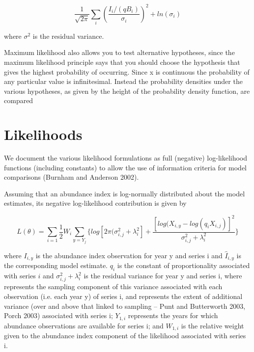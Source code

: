 \documentclass[a4paper,10pt]{article}
\begin{document}
\begin{equation}\label{eq4}
\frac{1}{\sqrt{2\pi}} \sum_i \left( \frac{I_{i}/(qB_{i})}{{\sigma}_{i}} \right)^2 +ln({\sigma}_{i})
\end{equation}

where $\sigma^2$ is the residual variance.

Maximum likelihood also allows you to test alternative hypotheses, since the maximum likelihood principle says that you should choose the hypothesis that gives the highest probability of occurring. Since x is continuous the probability of any particular value is infinitesimal. Instead the probability densities under the various hypotheses, as given by the height of the probability density function, are compared 

\section*{Likelihoods}

We document the various likelihood formulations as full (negative) log-likelihood functions (including constants) to allow the use of information criteria for model comparisons (Burnham and Anderson 2002). %

Assuming that an abundance index is log-normally distributed about the model estimates, its negative log-likelihood contribution is given by
  
\begin{equation}\label{eq3}
L(\theta)=\sum_{i=1} \frac{1}{2} W_i \sum_{y=Y_j}\Big\{  log[2\pi(\sigma^2_{i,j}+\lambda^2_{i}] +
                   \frac{[log(X_{i,y}-log(q_i{\hat X_{i,j}})]^2}{\sigma^2_{i,j}+\lambda^2_{i}}\Big\} 
\end{equation}
                   
where
$I_{i,y}$ is the abundance index observation for year y and series i and ${\hat I}_{i,y}$ is the corresponding model estimate.
$q_i$  is the constant of proportionality associated with series $i$ and ${\sigma^2_{i,j}+\lambda^2_{i}}$ is the residual variance for year y and series i, where  represents the sampling component of this variance associated with each observation (i.e. each year y) of series i, and  represents the extent of additional variance (over and above that linked to sampling – Punt and Butterworth 2003, Porch 2003) associated with series i;
$Y_{1,i}$ represents the years for which abundance observations are available for series i; and
$W_{1,i}$ is the relative weight given to the abundance index component of the likelihood associated with series i.
\end{document}
